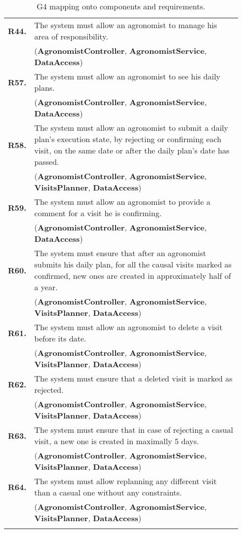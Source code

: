 \begin{longtable}{p{0.06\linewidth} p{0.88\linewidth}}
	\textbf{R44.} & The system must allow an agronomist to manage his area of responsibility.\\
	& (\textbf{AgronomistController}, \textbf{AgronomistService}, \textbf{DataAccess})\\
	\textbf{R57.} & The system must allow an agronomist to see his daily plans.\\
	& (\textbf{AgronomistController}, \textbf{AgronomistService}, \textbf{DataAccess})\\
	\textbf{R58.} & The system must allow an agronomist to submit a daily plan's execution state, by rejecting or confirming each visit, on the same date or after the daily plan's date has passed. \\
	& (\textbf{AgronomistController}, \textbf{AgronomistService}, \textbf{VisitsPlanner}, \textbf{DataAccess})\\
	\textbf{R59.} & The system must allow an agronomist to provide a comment for a visit he is confirming.\\
	& (\textbf{AgronomistController}, \textbf{AgronomistService}, \textbf{DataAccess})\\
	
	\textbf{R60.} & The system must ensure that after an agronomist submits his daily plan, for all the causal visits marked as confirmed, new ones are created in approximately half of a year.\\
	& (\textbf{AgronomistController}, \textbf{AgronomistService}, \textbf{VisitsPlanner}, \textbf{DataAccess})\\
	\textbf{R61.} & The system must allow an agronomist to delete a visit before its date.\\
	& (\textbf{AgronomistController}, \textbf{AgronomistService}, \textbf{VisitsPlanner}, \textbf{DataAccess})\\
	\textbf{R62.} & The system must ensure that a deleted visit is marked as rejected.\\
	& (\textbf{AgronomistController}, \textbf{AgronomistService}, \textbf{VisitsPlanner}, \textbf{DataAccess})\\
	\textbf{R63.} & The system must ensure that in case of rejecting a casual visit, a new one is created in maximally 5 days.\\
	& (\textbf{AgronomistController}, \textbf{AgronomistService}, \textbf{VisitsPlanner}, \textbf{DataAccess})\\
	\textbf{R64.} & The system must allow replanning any different visit than a casual one without any constraints.\\
	& (\textbf{AgronomistController}, \textbf{AgronomistService}, \textbf{VisitsPlanner}, \textbf{DataAccess})\\
    
    \bottomrule
    \caption{G4 mapping onto components and requirements.}
\end{longtable}
    

